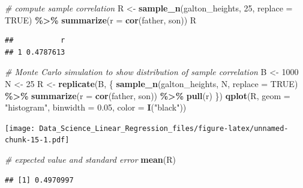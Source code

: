 \documentclass[
]{article}
\newenvironment{Shaded}{\begin{snugshade}}{\end{snugshade}}
\newcommand{\CommentTok}[1]{\textcolor[rgb]{0.56,0.35,0.01}{\textit{#1}}}
\newcommand{\DataTypeTok}[1]{\textcolor[rgb]{0.13,0.29,0.53}{#1}}
\newcommand{\DecValTok}[1]{\textcolor[rgb]{0.00,0.00,0.81}{#1}}
\newcommand{\FloatTok}[1]{\textcolor[rgb]{0.00,0.00,0.81}{#1}}
\newcommand{\KeywordTok}[1]{\textcolor[rgb]{0.13,0.29,0.53}{\textbf{#1}}}
\newcommand{\NormalTok}[1]{#1}
\newcommand{\OperatorTok}[1]{\textcolor[rgb]{0.81,0.36,0.00}{\textbf{#1}}}
\newcommand{\OtherTok}[1]{\textcolor[rgb]{0.56,0.35,0.01}{#1}}
\newcommand{\StringTok}[1]{\textcolor[rgb]{0.31,0.60,0.02}{#1}}
\begin{document}
\begin{Shaded}
\begin{Highlighting}[]
\CommentTok{\# compute sample correlation}
\NormalTok{R \textless{}{-}}\StringTok{ }\KeywordTok{sample\_n}\NormalTok{(galton\_heights, }\DecValTok{25}\NormalTok{, }\DataTypeTok{replace =} \OtherTok{TRUE}\NormalTok{) }\OperatorTok{\%\textgreater{}\%}
\StringTok{    }\KeywordTok{summarize}\NormalTok{(}\DataTypeTok{r =} \KeywordTok{cor}\NormalTok{(father, son))}
\NormalTok{R}
\end{Highlighting}
\end{Shaded}

\begin{verbatim}
##           r
## 1 0.4787613
\end{verbatim}

\begin{Shaded}
\begin{Highlighting}[]
\CommentTok{\# Monte Carlo simulation to show distribution of sample correlation}
\NormalTok{B \textless{}{-}}\StringTok{ }\DecValTok{1000}
\NormalTok{N \textless{}{-}}\StringTok{ }\DecValTok{25}
\NormalTok{R \textless{}{-}}\StringTok{ }\KeywordTok{replicate}\NormalTok{(B, \{}
    \KeywordTok{sample\_n}\NormalTok{(galton\_heights, N, }\DataTypeTok{replace =} \OtherTok{TRUE}\NormalTok{) }\OperatorTok{\%\textgreater{}\%}
\StringTok{    }\KeywordTok{summarize}\NormalTok{(}\DataTypeTok{r =} \KeywordTok{cor}\NormalTok{(father, son)) }\OperatorTok{\%\textgreater{}\%}
\StringTok{    }\KeywordTok{pull}\NormalTok{(r)}
\NormalTok{\})}
\KeywordTok{qplot}\NormalTok{(R, }\DataTypeTok{geom =} \StringTok{"histogram"}\NormalTok{, }\DataTypeTok{binwidth =} \FloatTok{0.05}\NormalTok{, }\DataTypeTok{color =} \KeywordTok{I}\NormalTok{(}\StringTok{"black"}\NormalTok{))}
\end{Highlighting}
\end{Shaded}

\texttt{[image: Data\_Science\_Linear\_Regression\_files/figure-latex/unnamed-chunk-15-1.pdf]}

\begin{Shaded}
\begin{Highlighting}[]
\CommentTok{\# expected value and standard error}
\KeywordTok{mean}\NormalTok{(R)}
\end{Highlighting}
\end{Shaded}

\begin{verbatim}
## [1] 0.4970997
\end{verbatim}
\end{document}
